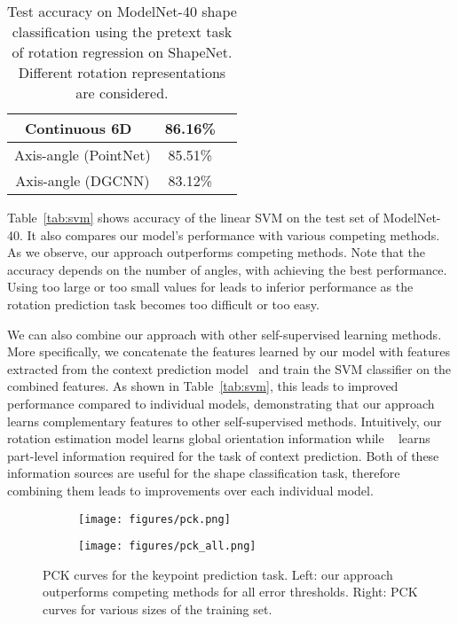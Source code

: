 \documentclass[10pt,twocolumn,letterpaper]{article}
\begin{document}
\begin{table}
\begin{center}
\begin{tabular}{c c c}
\hline
\hline
Continuous 6D~\cite{zhou2019continuity} & 86.16\% \\
\hline
\hline
Axis-angle (PointNet) & 85.51\% \\ \hline
\hline
Axis-angle (DGCNN) & 83.12\% \\ \hline
\hline
\end{tabular}
\end{center}
\caption{Test accuracy on ModelNet-40 shape classification using the pretext task of rotation regression on ShapeNet. Different rotation representations are considered.  
}\label{tab:svm-regress}
\end{table}


Table~\ref{tab:svm} shows accuracy of the linear SVM on the test set of ModelNet-40. It also compares our model's performance with various competing methods. 
As we observe, our approach outperforms competing methods. Note that the accuracy depends on the number of angles, with  achieving the best performance. 
Using too large or too small values for  leads to inferior performance as the rotation prediction task becomes too difficult or too easy. 

We can also combine our approach with other self-supervised learning methods. 
More specifically, we concatenate the features learned by our model with features extracted from the context prediction model~\cite{sauder2019context} and train the SVM classifier on the combined features. As shown in Table~\ref{tab:svm}, this leads to improved performance compared to individual models, demonstrating that our approach learns complementary features to other self-supervised methods.  Intuitively, our rotation estimation model learns global orientation information while ~\cite{sauder2019context} learns part-level information required for the task of context prediction. Both of these information sources are useful for the shape classification task, therefore combining them leads to improvements over each individual model. 

\begin{figure*}[t]
\begin{center}
\begin{subfigure}{.5\textwidth}
  \centering
  \texttt{[image: figures/pck.png]}
\end{subfigure}
\begin{subfigure}{.49\textwidth}
   \centering
   \texttt{[image: figures/pck\_all.png]}
\end{subfigure}
\end{center}
\caption{PCK curves for the keypoint prediction task. Left: our approach outperforms competing methods for all error thresholds. Right: PCK curves for various sizes of the training set. }
\label{fig:pck}
\end{figure*}
\end{document}
